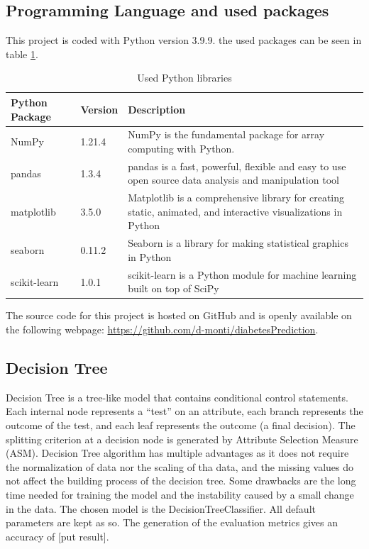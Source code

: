 \documentclass[11pt]{article}
\renewcommand{\arraystretch}{1.3}
\begin{document}
	\subsection{Programming Language and used packages}
		This project is coded with Python version 3.9.9. the used packages can be seen in table \ref{tab:Python}.
	\begin{table}[H]
		\renewcommand{\arraystretch}{1.3}
		
		\centering
		\begin{tabularx}{\linewidth}{llX}
			Python Package & Version & Description \\
			\toprule
			NumPy \cite{numpy} & 1.21.4 & NumPy is the fundamental package for array computing with Python.\\
			pandas \cite{pandas} & 1.3.4 & pandas is a fast, powerful, flexible and easy to use open source data analysis and manipulation tool\\
			matplotlib \cite{matplotlib} & 3.5.0 & Matplotlib is a comprehensive library for creating static, animated, and interactive visualizations in Python\\
			seaborn \cite{seaborn} &  0.11.2 & Seaborn is a library for making statistical graphics in Python \\
			scikit-learn \cite{scikit} & 1.0.1  & scikit-learn is a Python module for machine learning built on top of SciPy \\

		\end{tabularx}
		\caption{Used Python libraries}
		\label{tab:Python}
	\end{table}
	The source code for this project is hosted on GitHub and is openly available on the following webpage: \url{https://github.com/d-monti/diabetesPrediction}.

	
	\subsection{Decision Tree}
	Decision Tree is a tree-like model that contains conditional control statements. Each internal node represents a “test” on an attribute, each branch represents the outcome of the test, and each leaf represents the outcome (a final decision). The splitting criterion at a decision node is generated by Attribute Selection Measure (ASM).
	\medbreak
	Decision Tree algorithm has multiple advantages as it does not require the normalization of data nor the scaling of tha data, and the missing values do not affect the building process of the decision tree. Some drawbacks are the long time needed for training the model and the instability caused by a small change in the data.
	\medbreak
	The chosen model is the DecisionTreeClassifier. All default parameters are kept as so.
	The generation of the evaluation metrics gives an accuracy of [put result].
	
\end{document}

